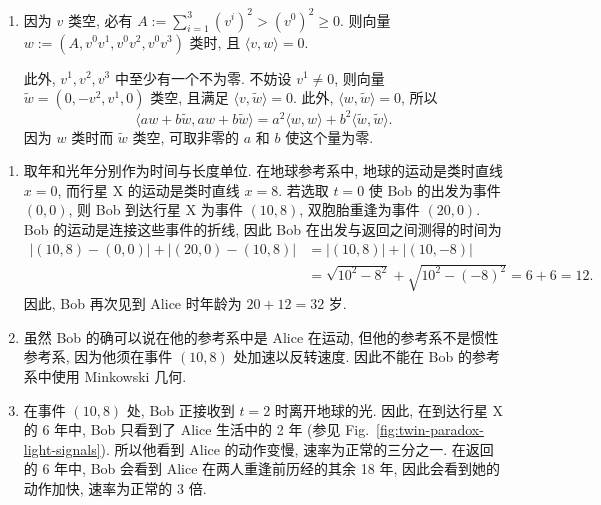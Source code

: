 \begin{description}[font=\normalfont,leftmargin=2em,labelwidth=1.5em]
\begin{enumerate}[label=(\alph*),ref=\alph*,leftmargin=*]
\begin{enumerate}[label=(\roman*),ref=\roman*,leftmargin=*]
此外, 等号成立当且仅当
\[
  \sum_{i=1}^3v^iw^i=\left(\sum_{i=1}^3(v^i)^2\right)^{1/2}
       \left(\sum_{i=1}^3(w^i)^2\right)^{1/2}
\]
且
\[
  \left(\sum_{i=1}^3(w^i)^2\right)^{1/2}=w^0.
\]
因此, 等号成立当且仅当 $w^i=\lambda v^i$, 其中 $\lambda>0$, 且
\[
  w^0=\lambda\left(\sum_{i=1}^3(v^i)^2\right)^{1/2}=\lambda v^0.
\]
\item 因为
\[
  \langle v+w,v+w\rangle=2\langle v,w\rangle+\langle w,w\rangle
\]
且 $\langle w,w\rangle\le0$ 及 $\langle v,w\rangle\le0$ [由 (\ref{sol:inner-product-with-future-null-vector})], 所以 $\langle v+w,v+w\rangle\le0$. 此外, 等号成立当且仅当 $\langle v,w\rangle=\langle w,w\rangle=0$, 即当且仅当 $w=\lambda v$, 其中 $\lambda>0$. 在所有情形下, $v+w$ 都显然指向未来.
\item 由 (\ref{sol:inner-product-with-future-null-vector}), 若 $\langle v,w\rangle=0$, 则 $w$ 不可能类时; 若 $w$ 零模, 它就是 $v$ 的倍数.
\end{enumerate}
\item 因为 $v$ 类空, 必有 $A:=\sum_{i=1}^3(v^i)^2>(v^0)^2\ge0$. 则向量 $w:=(A,v^0v^1,v^0v^2,v^0v^3)$ 类时, 且 $\langle v,w\rangle=0$.

此外, $v^1,v^2,v^3$ 中至少有一个不为零. 不妨设 $v^1\ne0$, 则向量 $\widetilde w=(0,-v^2,v^1,0)$ 类空, 且满足 $\langle v,\widetilde w\rangle=0$. 此外, $\langle w,\widetilde w\rangle=0$, 所以
\[
  \langle aw+b\widetilde w,aw+b\widetilde w\rangle
  =a^2\langle w,w\rangle+b^2\langle\widetilde w,\widetilde w\rangle.
\]
因为 $w$ 类时而 $\widetilde w$ 类空, 可取非零的 $a$ 和 $b$ 使这个量为零.
\end{enumerate}

\begin{enumerate}[label=(\alph*),ref=\alph*,leftmargin=*]
\item 取年和光年分别作为时间与长度单位. 在地球参考系中, 地球的运动是类时直线 $x=0$, 而行星 X 的运动是类时直线 $x=8$. 若选取 $t=0$ 使 Bob 的出发为事件 $(0,0)$, 则 Bob 到达行星 X 为事件 $(10,8)$, 双胞胎重逢为事件 $(20,0)$. Bob 的运动是连接这些事件的折线, 因此 Bob 在出发与返回之间测得的时间为
\begin{align*}
  |(10,8)-(0,0)|+|(20,0)-(10,8)|
  &=|(10,8)|+|(10,-8)|\\
  &=\sqrt{10^2-8^2}+\sqrt{10^2-(-8)^2}=6+6=12.
\end{align*}
因此, Bob 再次见到 Alice 时年龄为 $20+12=32$ 岁.
\item 虽然 Bob 的确可以说在他的参考系中是 Alice 在运动, 但他的参考系不是惯性参考系, 因为他须在事件 $(10,8)$ 处加速以反转速度. 因此不能在 Bob 的参考系中使用 Minkowski 几何.
\item 在事件 $(10,8)$ 处, Bob 正接收到 $t=2$ 时离开地球的光. 因此, 在到达行星 X 的 6 年中, Bob 只看到了 Alice 生活中的 2 年 (参见 Fig.~\ref{fig:twin-paradox-light-signals}). 所以他看到 Alice 的动作变慢, 速率为正常的三分之一. 在返回的 6 年中, Bob 会看到 Alice 在两人重逢前历经的其余 18 年, 因此会看到她的动作加快, 速率为正常的 3 倍.


\end{enumerate}
\end{description}

